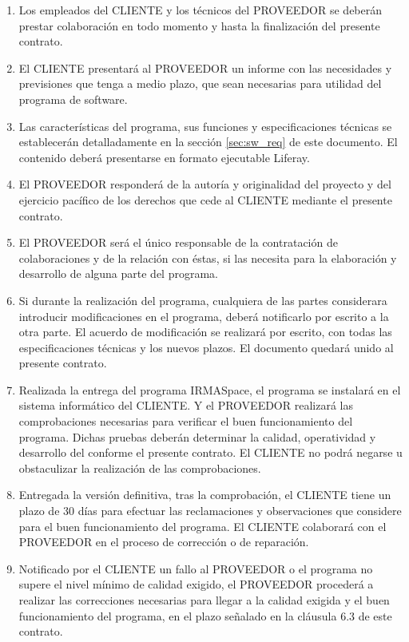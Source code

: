 \begin{description}[style=nextline]
\begin{enumerate}
\begin{enumerate}
  	\item  Los empleados del CLIENTE y los técnicos del PROVEEDOR se deberán prestar colaboración en todo momento y hasta la finalización del presente contrato.
  	\item El CLIENTE presentará al PROVEEDOR un informe con las necesidades y previsiones que tenga a medio plazo, que sean necesarias para utilidad del programa de software.
  	\item Las características del programa, sus funciones y especificaciones técnicas se establecerán detalladamente en la sección \ref{sec:sw_req} de este documento. El contenido deberá presentarse en formato ejecutable Liferay.
  	\item El PROVEEDOR responderá de la autoría y originalidad del proyecto y del ejercicio pacífico de los derechos que cede al CLIENTE mediante el presente contrato.
  	\item El PROVEEDOR será el único responsable de la contratación de colaboraciones y de la relación con éstas, si las necesita para la elaboración y desarrollo de alguna parte del programa.
  	\item Si durante la realización del programa, cualquiera de las partes considerara introducir modificaciones en el programa, deberá notificarlo por escrito a la otra parte. El acuerdo de modificación se realizará por escrito, con todas las especificaciones técnicas y los nuevos plazos. El documento quedará unido al presente contrato.
  	\item Realizada la entrega del programa IRMASpace, el programa se instalará en el sistema informático del CLIENTE. Y el PROVEEDOR realizará las comprobaciones necesarias para verificar el buen funcionamiento del programa. Dichas pruebas deberán determinar la calidad, operatividad y desarrollo del conforme el presente contrato. El CLIENTE no podrá negarse u obstaculizar la realización de las comprobaciones.
  \item Entregada la versión definitiva, tras la comprobación, el CLIENTE tiene un plazo de 30 días para efectuar las reclamaciones y observaciones que considere para el buen funcionamiento del programa. El CLIENTE colaborará con el PROVEEDOR en el proceso de corrección o de reparación.
  \item Notificado por el CLIENTE un fallo al PROVEEDOR o el programa no supere el nivel mínimo de calidad exigido, el PROVEEDOR procederá a realizar las correcciones necesarias para llegar a la calidad exigida y el buen funcionamiento del programa, en el plazo señalado en la cláusula 6.3 de este contrato.

\end{enumerate}
\end{enumerate}
\end{description}
